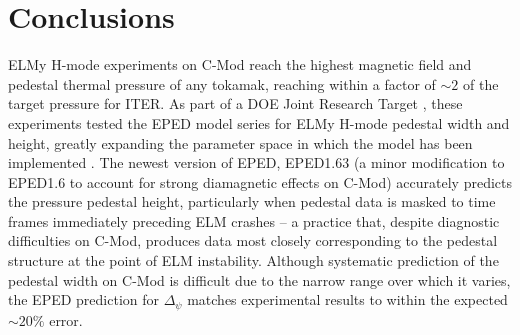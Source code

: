 \begin{figure}[ht]
 \pushtooutside
\end{figure}

\section{Conclusions}\label{sec:elmy_conclusion}

ELMy H-mode experiments on C-Mod reach the highest magnetic field and pedestal thermal pressure of any tokamak, reaching within a factor of $\sim 2$ of the target pressure for ITER.  As part of a DOE Joint Research Target \cite{Groebner2013}, these experiments tested the EPED model series \cite{Snyder2009} for ELMy H-mode pedestal width and height, greatly expanding the parameter space in which the model has been implemented \cite{Walk2012}.  The newest version of EPED, EPED1.63 (a minor modification to EPED1.6 to account for strong diamagnetic effects on C-Mod) accurately predicts the pressure pedestal height, particularly when pedestal data is masked to time frames immediately preceding ELM crashes -- a practice that, despite diagnostic difficulties on C-Mod, produces data most closely corresponding to the pedestal structure at the point of ELM instability.  Although systematic prediction of the pedestal width on C-Mod is difficult due to the narrow range over which it varies, the EPED prediction for $\Delta_\psi$ matches experimental results to within the expected $\sim 20\%$ error.  

